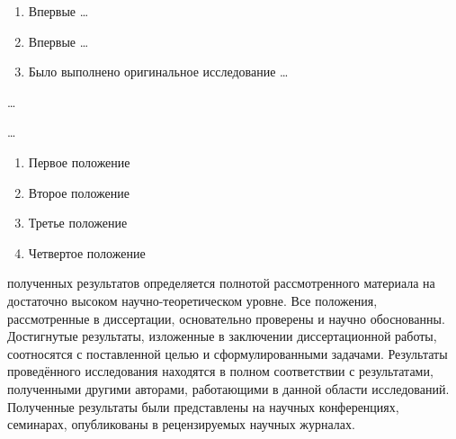 {\novelty}
\begin{enumerate}[beginpenalty=10000] %
  \item Впервые \ldots
  \item Впервые \ldots
  \item Было выполнено оригинальное исследование \ldots
\end{enumerate}

{\influence} \ldots

{\methods} \ldots

{}
\begin{enumerate}[beginpenalty=10000] %
  \item Первое положение
  \item Второе положение
  \item Третье положение
  \item Четвертое положение
\end{enumerate}

{\reliability} полученных результатов определяется полнотой рассмотренного материала на достаточно высоком научно-теоретическом уровне. Все положения,  рассмотренные в диссертации, основательно проверены и научно обоснованны. Достигнутые результаты, изложенные в заключении диссертационной работы, соотносятся с поставленной целью и сформулированными задачами. Результаты проведённого исследования находятся в полном соответствии с результатами, полученными другими авторами, работающими в данной области исследований. Полученные результаты были представлены на научных конференциях, семинарах, опубликованы в рецензируемых научных журналах.


